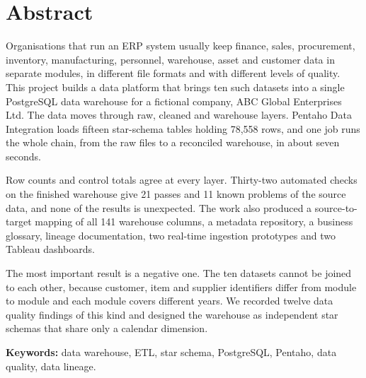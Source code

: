 \documentclass[12pt,a4paper]{report}
\begin{document}
\chapter*{Abstract}
Organisations that run an ERP system usually keep finance, sales, procurement, inventory, manufacturing, personnel, warehouse, asset and customer data in separate modules, in different file formats and with different levels of quality. This project builds a data platform that brings ten such datasets into a single PostgreSQL data warehouse for a fictional company, ABC Global Enterprises Ltd. The data moves through raw, cleaned and warehouse layers. Pentaho Data Integration loads fifteen star-schema tables holding 78,558 rows, and one job runs the whole chain, from the raw files to a reconciled warehouse, in about seven seconds.

Row counts and control totals agree at every layer. Thirty-two automated checks on the finished warehouse give 21 passes and 11 known problems of the source data, and none of the results is unexpected. The work also produced a source-to-target mapping of all 141 warehouse columns, a metadata repository, a business glossary, lineage documentation, two real-time ingestion prototypes and two Tableau dashboards.

The most important result is a negative one. The ten datasets cannot be joined to each other, because customer, item and supplier identifiers differ from module to module and each module covers different years. We recorded twelve data quality findings of this kind and designed the warehouse as independent star schemas that share only a calendar dimension.

\bigskip\noindent\textbf{Keywords:} data warehouse, ETL, star schema, PostgreSQL, Pentaho, data quality, data lineage.

\clearpage
\tableofcontents
\clearpage
\listoffigures
{}
\clearpage
\listoftables
{}
\clearpage
\end{document}
